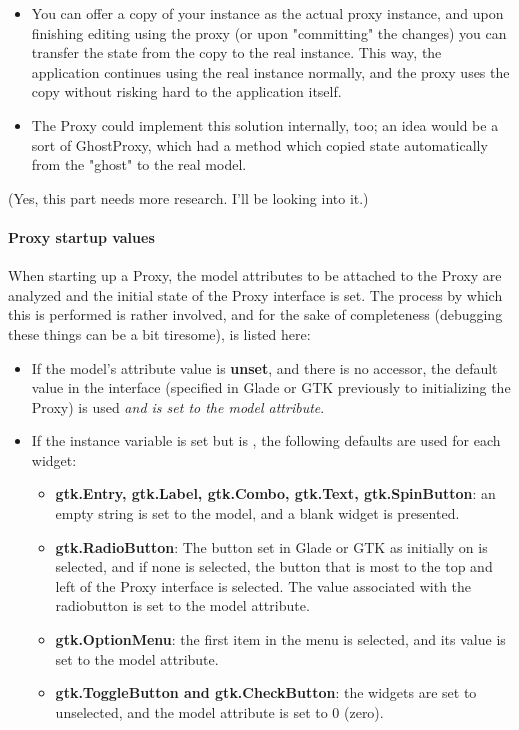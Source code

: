\documentclass[a4paper]{howto}
\begin{document}
\begin{itemize}
\item You can offer a copy of your instance as the actual proxy
instance, and upon finishing editing using the proxy (or upon
"committing" the changes) you can transfer the state from the copy to
the real instance. This way, the application continues using the real
instance normally, and the proxy uses the copy without risking hard to
the application itself.

\item The Proxy could implement this solution internally, too; an idea
would be a sort of GhostProxy, which had a  method which
copied state automatically from the "ghost" to the real model.
\end{itemize}

(Yes, this part needs more research. I'll be looking into it.)

\paragraph{Proxy startup values}

When starting up a Proxy, the model attributes to be attached to the
Proxy are analyzed and the initial state of the Proxy interface is set.
The process by which this is performed is rather involved, and for the
sake of completeness (debugging these things can be a bit tiresome), is
listed here:

\begin{itemize}
\item If the model's attribute value is {\bf unset}, and there is no
accessor, the default value in the interface (specified in Glade or GTK
previously to initializing the Proxy) is used {\it and is set to the
model attribute}.
\item If the instance variable is set but is , the following
defaults are used for each widget:
    \begin{itemize}
    \item {\bf gtk.Entry, gtk.Label, gtk.Combo, gtk.Text, gtk.SpinButton}: an
    empty string is set to the model, and a blank widget is presented.
    \item {\bf gtk.RadioButton}: The button set in Glade or GTK as
    initially on is selected, and if none is selected, the button that
    is most to the top and left of the Proxy interface is selected. The
    value associated with the radiobutton is set to the model attribute.
    \item {\bf gtk.OptionMenu}: the first item in the menu is selected, and
    its value is set to the model attribute.
    \item {\bf gtk.ToggleButton and gtk.CheckButton}: the widgets are set
    to unselected, and the model attribute is set to 0 (zero).
    \end{itemize}
\end{itemize}
\end{document}
